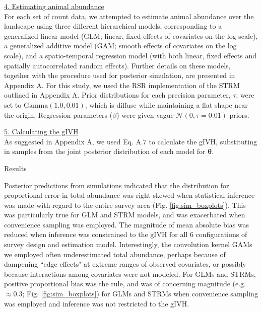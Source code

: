 \documentclass[12pt,fleqn]{article}
\begin{document}
\begin{flushleft}
\underline{4. Estimating animal abundance} \\

For each set of count data, we attempted to estimate animal abundance over the landscape using three different hierarchical models, corresponding to a generalized linear model (GLM; linear, fixed effects of covariates on the log scale), a generalized additive model (GAM; smooth effects of covariates on the log scale), and a spatio-temporal regression model (with both linear, fixed effects and spatially autocorrelated random effects).  Further details on these models, together with the procedure used for posterior simulation, are presented in Appendix A.  For this study, we used the RSR implementation of the STRM outlined in Appendix A.  Prior distributions for each precision parameter, $\tau$, were set to $\text{Gamma}(1.0,0.01)$, which is diffuse while maintaining a flat shape near the origin.  Regression parameters ($\beta$) were given vague $\mathcal{N}(0,\tau=0.01)$ priors.


\underline{5. Calculating the gIVH} \\

As suggested in Appendix A, we used Eq. A.7 to calculate the gIVH, substituting in samples from the joint posterior distribution of each model for $\boldsymbol{\theta}$.

\centerline{\sc Results}

Posterior predictions from simulations indicated that the distribution for proportional error in total abundance was right skewed when statistical inference was made with regard to the entire survey area (Fig. \ref{fig:sim_boxplots}).  This was particularly true for GLM and STRM models, and was exacerbated when convenience sampling was employed.  The magnitude of mean absolute bias was reduced when inference was constrained to the gIVH for all 6 configurations of survey design and estimation model.  Interestingly, the convolution kernel GAMs we employed often underestimated total abundance, perhaps because of dampening ``edge effects" at extreme ranges of observed covariates, or possibly because interactions among covariates were not modeled.  For GLMs and STRMs, positive proportional bias was the rule, and was of concerning magnitude (e.g. $\approx 0.3$; Fig. \ref{fig:sim_boxplots}) for GLMs and STRMs when convenience sampling was employed and inference was not restricted to the gIVH.


\renewcommand{\refname}{Literature Cited}




\end{flushleft}
\end{document}
